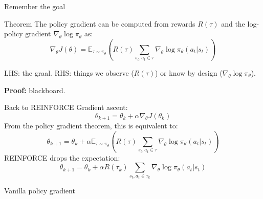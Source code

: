 \documentclass[11pt, aspectratio=169]{beamer}
\begin{document}
\begin{frame}{Remember the goal}
    \begin{block}{Theorem}
        The policy gradient can be computed from rewards $R(\tau)$ and the log-policy gradient $\nabla_\theta \log \pi_\theta$ as:
        \begin{equation*}
            \nabla_\theta J(\theta) = \mathbb{E}_{\tau \sim \pi_\theta} \left(
            R(\tau)
            \sum_{s_t, a_t \in \tau} \nabla_\theta \log \pi_\theta(a_t | s_t)
            \right)
        \end{equation*}
    \end{block}
    LHS: the graal. RHS: things we observe ($R(\tau)$) or know by design ($\nabla_\theta \log \pi_\theta$).

    \textbf{Proof:} blackboard.
\end{frame}

\begin{frame}{Back to REINFORCE}
    Gradient ascent:
    $$
    \theta_{k+1} = \theta_k + \alpha \nabla_\theta J(\theta_k)
    $$
    From the policy gradient theorem, this is equivalent to:
    $$
    \theta_{k+1} = \theta_k + \alpha \mathbb{E}_{\tau \sim \pi_\theta} \left(
            R(\tau)
            \sum_{s_t, a_t \in \tau} \nabla_\theta \log \pi_\theta(a_t | s_t)
            \right)
    $$
    REINFORCE drops the expectation:
    $$
    \theta_{k+1} = \theta_k + \alpha R(\tau_k) \sum_{s_t, a_t \in \tau_k} \nabla_\theta \log \pi_\theta(a_t | s_t)
    $$
\end{frame}

\begin{frame}
    \begin{block}{Vanilla policy gradient~\cite{spinningup}}
        \centering
    \end{block}
    \vspace{-1.5em}
\end{frame}
\end{document}
